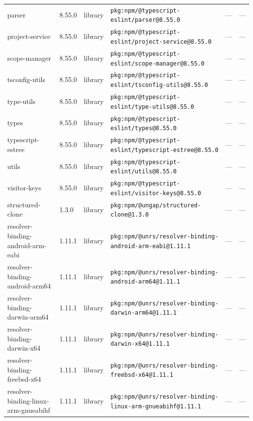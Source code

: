 \documentclass[11pt,a4paper]{article}
\begin{document}
\begin{longtable}{|p{4cm}|p{2cm}|p{1.6cm}|p{5cm}|p{1.5cm}|p{3.5cm}|}
\raggedright parser & 8.55.0 & library & \small\texttt{pkg:npm/@typescript-eslint/parser@8.55.0} & — & \small — \\
\raggedright project-service & 8.55.0 & library & \small\texttt{pkg:npm/@typescript-eslint/project-service@8.55.0} & — & \small — \\
\raggedright scope-manager & 8.55.0 & library & \small\texttt{pkg:npm/@typescript-eslint/scope-manager@8.55.0} & — & \small — \\
\raggedright tsconfig-utils & 8.55.0 & library & \small\texttt{pkg:npm/@typescript-eslint/tsconfig-utils@8.55.0} & — & \small — \\
\raggedright type-utils & 8.55.0 & library & \small\texttt{pkg:npm/@typescript-eslint/type-utils@8.55.0} & — & \small — \\
\raggedright types & 8.55.0 & library & \small\texttt{pkg:npm/@typescript-eslint/types@8.55.0} & — & \small — \\
\raggedright typescript-estree & 8.55.0 & library & \small\texttt{pkg:npm/@typescript-eslint/typescript-estree@8.55.0} & — & \small — \\
\raggedright utils & 8.55.0 & library & \small\texttt{pkg:npm/@typescript-eslint/utils@8.55.0} & — & \small — \\
\raggedright visitor-keys & 8.55.0 & library & \small\texttt{pkg:npm/@typescript-eslint/visitor-keys@8.55.0} & — & \small — \\
\raggedright structured-clone & 1.3.0 & library & \small\texttt{pkg:npm/@ungap/structured-clone@1.3.0} & — & \small — \\
\raggedright resolver-binding-android-arm-eabi & 1.11.1 & library & \small\texttt{pkg:npm/@unrs/resolver-binding-android-arm-eabi@1.11.1} & — & \small — \\
\raggedright resolver-binding-android-arm64 & 1.11.1 & library & \small\texttt{pkg:npm/@unrs/resolver-binding-android-arm64@1.11.1} & — & \small — \\
\raggedright resolver-binding-darwin-arm64 & 1.11.1 & library & \small\texttt{pkg:npm/@unrs/resolver-binding-darwin-arm64@1.11.1} & — & \small — \\
\raggedright resolver-binding-darwin-x64 & 1.11.1 & library & \small\texttt{pkg:npm/@unrs/resolver-binding-darwin-x64@1.11.1} & — & \small — \\
\raggedright resolver-binding-freebsd-x64 & 1.11.1 & library & \small\texttt{pkg:npm/@unrs/resolver-binding-freebsd-x64@1.11.1} & — & \small — \\
\raggedright resolver-binding-linux-arm-gnueabihf & 1.11.1 & library & \small\texttt{pkg:npm/@unrs/resolver-binding-linux-arm-gnueabihf@1.11.1} & — & \small — \\

\end{longtable}
\end{document}
